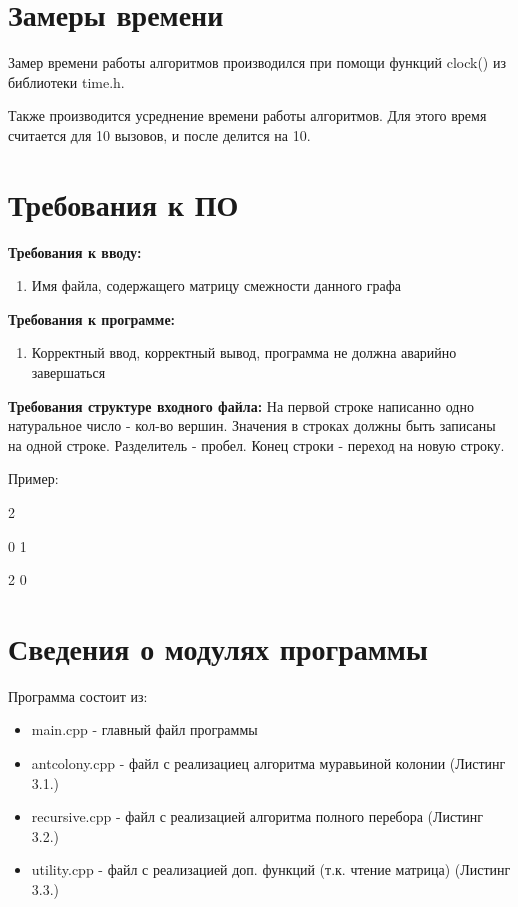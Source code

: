 \documentclass[12pt]{report}
\begin{document}
	\section{Замеры времени}
	Замер времени работы алгоритмов производился при помощи функций clock() из библиотеки time.h.
	
	Также производится усреднение времени работы алгоритмов. Для этого время считается для 10 вызовов, и после делится на 10.
	
	
	\section{Требования к ПО}
	
	\textbf{Требования к вводу:}
	\begin{enumerate}
		\item Имя файла, содержащего матрицу смежности данного графа
	\end{enumerate}
	\textbf{Требования к программе:}
	\begin{enumerate}
		\item Корректный ввод, корректный вывод, программа не должна аварийно завершаться
	\end{enumerate}
	
	\textbf{Требования структуре входного файла:}
	На первой строке написанно одно натуральное число - кол-во вершин.
	Значения в строках должны быть записаны на одной строке. Разделитель - пробел. Конец строки - переход на новую строку.
	
	Пример:
	
		2
		
		0 1
		
		2 0
	
	\section{Сведения о модулях программы}
	Программа состоит из:
	\begin{itemize}
		\item main.cpp - главный файл программы
		\item antcolony.cpp - файл с реализациец алгоритма муравьиной колонии (Листинг 3.1.)
		\item recursive.cpp - файл с реализацией алгоритма полного перебора (Листинг 3.2.)
		\item utility.cpp - файл с реализацией доп. функций (т.к. чтение матрица) (Листинг 3.3.)
	\end{itemize}
\end{document}
